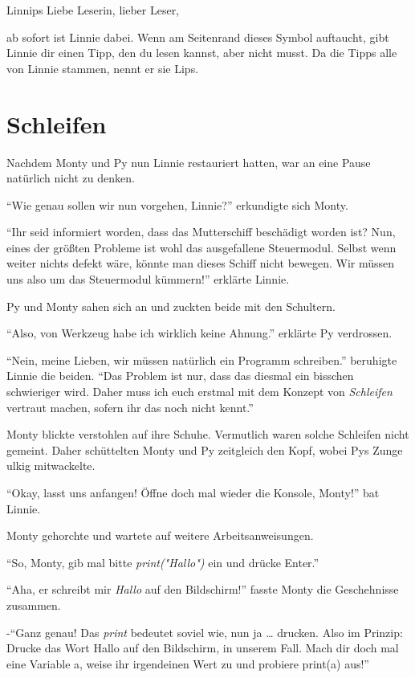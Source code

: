 \documentclass[a5paper,12pt,twoside,openright]{scrbook}
\begin{document}
\begin{aufgabe}{Linnips}
 Liebe Leserin, lieber Leser,

 ab sofort ist Linnie dabei. 
 Wenn am Seitenrand dieses Symbol auftaucht,
 gibt Linnie dir einen Tipp, den du lesen kannst, aber nicht musst. 
 Da die Tipps alle von Linnie stammen, nennt er sie Lips.
\end{aufgabe}

\chapter{Schleifen}


Nachdem Monty und Py nun Linnie restauriert hatten, war an eine Pause natürlich nicht zu denken.

"`Wie genau sollen wir nun vorgehen, Linnie?"' erkundigte sich Monty.

"`Ihr seid informiert worden, dass das Mutterschiff beschädigt worden ist? 
Nun, eines der größten Probleme ist wohl das ausgefallene Steuermodul.
Selbst wenn weiter nichts defekt wäre, könnte man dieses Schiff nicht bewegen.
Wir müssen uns also um das Steuermodul kümmern!"' erklärte Linnie.

Py und Monty sahen sich an und zuckten beide mit den Schultern.

"`Also, von Werkzeug habe ich wirklich keine Ahnung."' erklärte Py verdrossen.

"`Nein, meine Lieben, wir müssen natürlich ein Programm schreiben."' beruhigte Linnie die beiden.
"`Das Problem ist nur, dass das diesmal ein bisschen schwieriger wird. 
Daher muss ich euch erstmal mit dem Konzept von \emph{Schleifen} vertraut machen, sofern ihr das noch nicht kennt."'

Monty blickte verstohlen auf ihre Schuhe. Vermutlich waren solche Schleifen nicht gemeint.
Daher schüttelten Monty und Py zeitgleich den Kopf, wobei Pys Zunge ulkig mitwackelte.

"`Okay, lasst uns anfangen! Öffne doch mal wieder die Konsole, Monty!"' bat Linnie.

Monty gehorchte und wartete auf weitere Arbeitsanweisungen. 

"`So, Monty, gib mal bitte \emph{print("Hallo")} ein und drücke Enter."' 
 
"`Aha, er schreibt mir \emph{Hallo} auf den Bildschirm!"' fasste Monty die Geschehnisse zusammen.

-"`Ganz genau! Das \emph{print} bedeutet soviel wie, nun ja \ldots{} drucken. Also im Prinzip: Drucke das Wort Hallo auf den Bildschirm, in unserem Fall.
Mach dir doch mal eine Variable a, weise ihr irgendeinen Wert zu und probiere print(a) aus!"'
 
\end{document}
